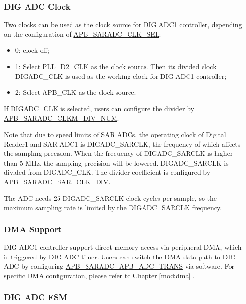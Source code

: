 \documentclass[main\_\_EN.tex]{subfiles}
\begin{document}
\subsubsection{DIG ADC Clock}\label{sec:dig-adc-clock}

Two clocks can be used as the clock source for DIG ADC1 controller, depending on the configuration of \hyperref[fielddesc:APBSARADCCLKSEL]{APB\_SARADC\_CLK\_SEL}:
\begin{itemize}
    \item 0: clock off;
    \item 1: Select PLL\_D2\_CLK as the clock source. Then its divided clock DIGADC\_CLK is used as the working clock for DIG ADC1 controller;
    \item 2: Select APB\_CLK as the clock source.
\end{itemize}

If DIGADC\_CLK is selected, users can configure the divider by \hyperref[fielddesc:APBSARADCCLKMDIVNUM]{APB\_SARADC\_CLKM\_DIV\_NUM}.

Note that due to speed limits of SAR ADCs, the operating clock of Digital Reader1 and SAR ADC1 is DIGADC\_SARCLK, the frequency of which affects the sampling precision. When the frequency of DIGADC\_SARCLK is higher than 5 MHz, the sampling precision will be lowered. DIGADC\_SARCLK is divided from DIGADC\_CLK. The divider coefficient is configured by \hyperref[fielddesc:APBSARADCSARCLKDIV]{APB\_SARADC\_SAR\_CLK\_DIV}.

The ADC needs 25 DIGADC\_SARCLK clock cycles per sample, so the maximum sampling rate is limited by the DIGADC\_SARCLK frequency.

\subsubsection{DMA Support}

DIG ADC1 controller support direct memory access via peripheral DMA, which is triggered by DIG ADC timer. Users can switch the DMA data path to DIG ADC by configuring \hyperref[fielddesc:APBSARADCAPBADCTRANS]{APB\_SARADC\_APB\_ADC\_TRANS} via software. For specific DMA configuration, please refer to Chapter \ref{mod:dma} \textit{}.





\subsubsection{DIG ADC FSM}
\end{document}
